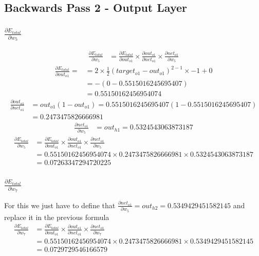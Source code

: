 \documentclass{article}
\begin{document}
\subsection{Backwards Pass 2 - Output Layer}
\subsubsection{$\frac{\partial E_{total}}{\partial w_5}$}

\begin{align*}
    \frac{\partial E_{total}}{\partial w_5} & =
    \frac{\partial E_{total}}{\partial out_{o1}} \times
    \frac{\partial out_{o1}}{\partial net_{o1}} \times
    \frac{\partial net_{o1}}{\partial w_5} 
\end{align*}
\begin{align*}
    \frac{\partial E_{total}}{\partial out_{o1}} =
    & = 2 \times \frac{1}{2}(target_{o1} - out_{o1})^{2 - 1} \times -1 + 0 \\
    & = -(0- 0.5515016245695407) \\
    & = 0.55150162456954074
\end{align*}
\begin{align*}
    \frac{\partial out_{o1}}{\partial net_{o1}} & =
    out_{o1}(1 - out_{o1}) = 0.5515016245695407(1- 0.5515016245695407) \\
    & = 0.2473475826666981
\end{align*}
\begin{align*}
    \frac{\partial net_{o1}}{\partial w_5} & = 
    out_{h1} = 0.5324543063873187
\end{align*}
\begin{align*}
    \frac{\partial E_{total}}{\partial w_5} & =
    \frac{\partial E_{total}}{\partial out_{o1}} \times
    \frac{\partial out_{o1}}{\partial net_{o1}} \times
    \frac{\partial net_{o1}}{\partial w_5} \\
    & = 0.55150162456954074 \times 0.2473475826666981 \times 0.5324543063873187 \\
    & = 0.07263347294720225
\end{align*}

\subsubsection{$\frac{\partial E_{total}}{\partial w_7}$}
For this we just have to define that $
    \frac{\partial net_{o1}}{\partial w_5} = out_{h2} = 0.5349429451582145
$ and replace it in the previous formula
\begin{align*}
    \frac{\partial E_{total}}{\partial w_7} & =
    \frac{\partial E_{total}}{\partial out_{o1}} \times
    \frac{\partial out_{o1}}{\partial net_{o1}} \times
    \frac{\partial net_{o1}}{\partial w_7} \\
    & = 0.55150162456954074 \times 0.2473475826666981 \times 0.5349429451582145
    \\
    & = 0.0729729546166579
\end{align*}
\end{document}
